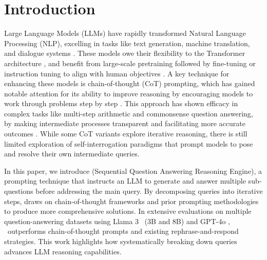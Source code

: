 


\section{Introduction}
\label{sec:introduction}

Large Language Models (LLMs) have rapidly transformed Natural Language Processing (NLP), excelling in tasks like text generation, machine translation, and dialogue systems \cite{brownLanguageModelsAre2020,kojimaLargeLanguageModels2022}. These models owe their flexibility to the Transformer architecture \cite{vaswaniAttentionAllYou2017}, and benefit from large-scale pretraining followed by fine-tuning or instruction tuning to align with human objectives \cite{ouyangTrainingLanguageModels2022,weiFinetunedLanguageModels2022}. A key technique for enhancing these models is chain-of-thought (CoT) prompting, which has gained notable attention for its ability to improve reasoning by encouraging models to work through problems step by step \citep{weiChainofThoughtPromptingElicits2023}. This approach has shown efficacy in complex tasks like multi-step arithmetic and commonsense question answering, by making intermediate processes transparent and facilitating more accurate outcomes \cite{snellScalingLLMTestTime2024}. While some CoT variants explore iterative reasoning, there is still limited exploration of self-interrogation paradigms that prompt models to pose and resolve their own intermediate queries.



In this paper, we introduce \rephrase{} (Sequential Question Answering Reasoning Engine), a prompting technique that instructs an LLM to generate and answer multiple sub-questions before addressing the main query. By decomposing queries into iterative steps, \rephrase{} draws on chain-of-thought frameworks and prior prompting methodologies~\citep{dengRephraseRespondLet2024} to produce more comprehensive solutions. In extensive evaluations on multiple question-answering datasets using Llama 3~\cite{grattafioriLlama3Herd2024} (3B and 8B) and \mbox{GPT-4o} \citep{openaiGPT4oSystemCard2024}, \mbox{\rephrase{} outperforms} chain-of-thought prompts and existing rephrase-and-respond strategies. This work highlights how systematically breaking down queries advances LLM reasoning capabilities.

